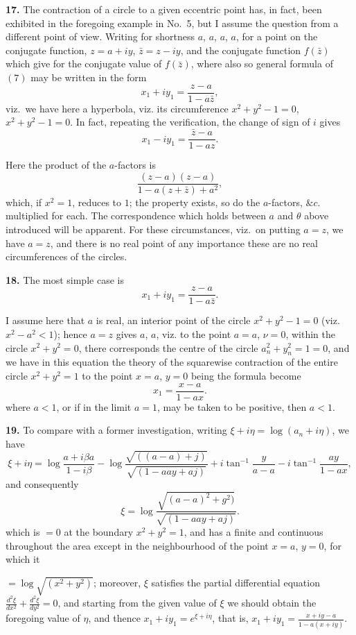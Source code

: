\documentclass[11pt,a4paper]{article}
\begin{document}
\textbf{17.} The contraction of a circle to a given eccentric point has, in fact, been exhibited in the foregoing example in No.\ 5, but I assume the question from a different point of view. Writing for shortness $a$, $a$, $a$, $a$, for a point on the conjugate function, $z = a + iy$, $\bar{z} = z - iy$, and the conjugate function $f(\bar{z})$ which give for the conjugate value of $f(\bar{z})$, where also so general formula of $(7)$ may be written in the form
\[
x_1 + iy_1 = \frac{z - a}{1 - a\bar{z}},
\]
viz.\ we have here a hyperbola, viz. its circumference $x^2 + y^2 - 1 = 0$, $x^2 + y^2 - 1 = 0$. In fact, repeating the verification, the change of sign of $i$ gives
\[
x_1 - iy_1 = \frac{\bar{z} - a}{1 - a z}.
\]

Here the product of the $a$-factors is
\[
\frac{(z - a)(z - a)}{1 - a(z + \bar{z}) + a^2},
\]
which, if $x^2 = 1$, reduces to $1$; the property exists, so do the $a$-factors, $\&c.$ multiplied for each. The correspondence which holds between $a$ and $\theta$ above introduced will be apparent. For these circumstances, viz.\ on putting $a = z$, we have $a = z$, and there is no real point of any importance these are no real circumferences of the circles.

\textbf{18.} The most simple case is
\[
x_1 + iy_1 = \frac{z - a}{1 - a \bar{z}}.
\]

I assume here that $a$ is real, an interior point of the circle $x^2 + y^2 - 1 = 0$ (viz. $x^2 - a^2 < 1$); hence $a = z$ gives $a$, $a$, viz. to the point $a = a$, $\nu = 0$, within the circle $x^2 + y^2 = 0$, there corresponds the centre of the circle $a_n^2 + y_n^2 = 1 = 0$, and we have in this equation the theory of the squarewise contraction of the entire circle $x^2 + y^2 = 1$ to the point $x = a$, $y = 0$ being the formula become
\[
x_1 = \frac{x - a}{1 - a x}.
\]
where $a < 1$, or if in the limit $a = 1$, may be taken to be positive, then $a < 1$.

\textbf{19.} To compare with a former investigation, writing $\xi + i\eta = \log (a_n + i\eta)$, we have
\[
\xi + i\eta = \log \frac{a + i\beta a}{1 - i\beta} - \log \frac{\sqrt{((a - a) + j)}}{\sqrt{(1 - a a y + a j)}} + i \tan^{-1}\frac{y}{a - a} - i \tan^{-1}\frac{a y}{1 - a x},
\]
and consequently
\[
\xi = \log \frac{\sqrt{(a - a)^2 + g^2)}}{\sqrt{(1 - a a y + a j)}}.
\]
which is $= 0$ at the boundary $x^2 + y^2 = 1$, and has a finite and continuous throughout the area except in the neighbourhood of the point $x = a$, $y = 0$, for which it

$= \log \sqrt{(x^2 + y^2)}$; moreover, $\xi$ satisfies the partial differential equation $\frac{d^2 \xi}{dx^2} + \frac{d^2 \xi}{dy^2} = 0$, and starting from the given value of $\xi$ we should obtain the foregoing value of $\eta$, and thence $x_1 + iy_1 = e^{\xi + i\eta}$, that is, $x_1 + iy_1 = \frac{x + iy - a}{1 - a(x + iy)}$.
\end{document}
